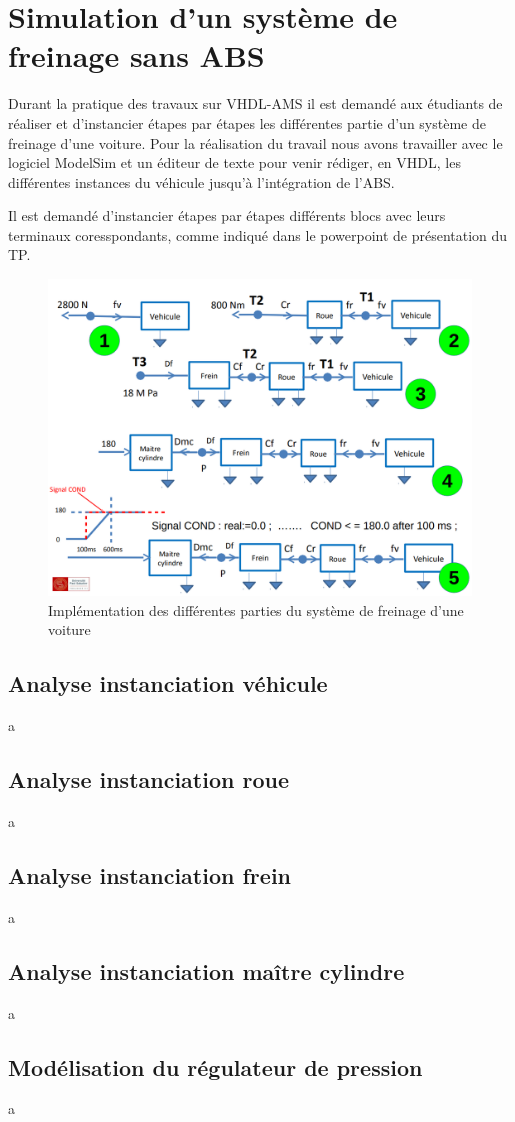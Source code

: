 \section{Simulation d'un système de freinage sans ABS}
Durant la pratique des travaux sur VHDL-AMS il est demandé aux étudiants de réaliser et d'instancier étapes par étapes les différentes partie d'un système de freinage d'une voiture. Pour la réalisation du travail nous avons travailler avec le logiciel ModelSim et un éditeur de texte pour venir rédiger, en VHDL, les différentes instances du véhicule jusqu'à l'intégration de l'ABS.

Il est demandé d'instancier étapes par étapes différents blocs avec leurs terminaux coresspondants, comme indiqué dans le powerpoint de présentation du TP.
\begin{figure}[h]
    \centering
    \includegraphics[width=\textwidth]{images/etapes.png}
    \caption{Implémentation des différentes parties du système de freinage d'une voiture}
\end{figure}

\subsection{Analyse instanciation véhicule }
a
\subsection{Analyse instanciation roue}
a
\subsection{Analyse instanciation frein}
a
\subsection{Analyse instanciation maître cylindre}
a
\subsection{Modélisation du régulateur de pression}
a
\newpage